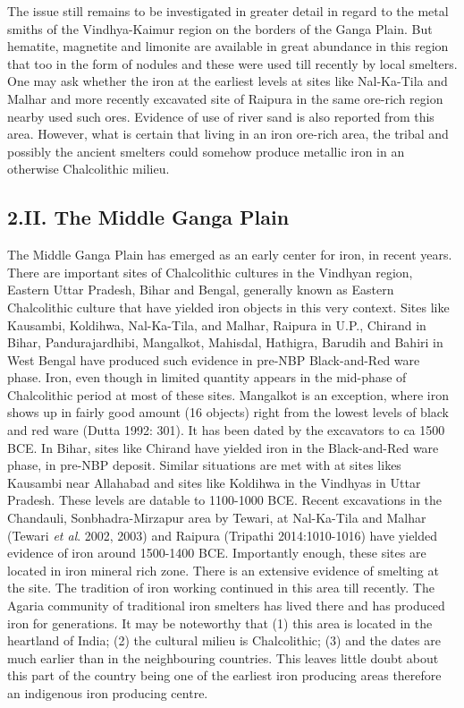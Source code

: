 The issue still remains to be investigated in greater detail in regard to the metal smiths of the Vindhya-Kaimur region on the borders of the Ganga Plain. But hematite, magnetite and limonite are available in great abundance in this region that too in the form of nodules and these were used till recently by local smelters. One may ask whether the iron at the earliest levels at sites like Nal-Ka-Tila and Malhar and more recently excavated site of Raipura in the same ore-rich region nearby used such ores. Evidence of use of river sand is also reported from this area. However, what is certain that living in an iron ore-rich area, the tribal and possibly the ancient smelters could somehow produce metallic iron in an otherwise Chalcolithic milieu.

\subsection*{2.II. The Middle Ganga Plain}\label{subsection-5}

The Middle Ganga Plain has emerged as an early center for iron, in recent years. There are important sites of Chalcolithic cultures in the Vindhyan region, Eastern Uttar Pradesh, Bihar and Bengal, generally known as Eastern Chalcolithic culture that have yielded iron objects in this very context. Sites like Kausambi, Koldihwa, Nal-Ka-Tila, and Malhar, Raipura in U.P., Chirand in Bihar, Pandurajardhibi, Mangalkot, Mahisdal, Hathigra, Barudih and Bahiri in West Bengal have produced such evidence in pre-NBP Black-and-Red ware phase. Iron, even though in limited quantity appears in the mid-phase of Chalcolithic period at most of these sites. Mangalkot is an exception, where iron shows up in fairly good amount (16 objects) right from the lowest levels of black and red ware (Dutta 1992: 301). It has been dated by the excavators to ca 1500 BCE. In Bihar, sites like Chirand have yielded iron in the Black-and-Red ware phase, in pre-NBP deposit. Similar situations are met with at sites likes Kausambi near Allahabad and sites like Koldihwa in the Vindhyas in Uttar Pradesh. These levels are datable to 1100-1000 BCE. Recent excavations in the Chandauli, Sonbhadra-Mirzapur area by Tewari, at Nal-Ka-Tila and Malhar (Tewari \textit{et al}. 2002, 2003) and Raipura (Tripathi 2014:1010-1016) have yielded evidence of iron around 1500-1400 BCE. Importantly enough, these sites are located in iron mineral rich zone. There is an extensive evidence of smelting at the site. The tradition of iron working continued in this area till recently. The Agaria community of traditional iron smelters has lived there and has produced iron for generations. It may be noteworthy that (1) this area is located in the heartland of India; (2) the cultural milieu is Chalcolithic; (3) and the dates are much earlier than in the neighbouring countries. This leaves little doubt about this part of the country being one of the earliest iron producing areas therefore an indigenous iron producing centre.

